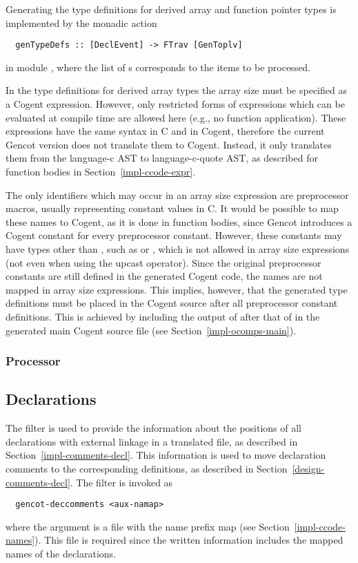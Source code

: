 Generating the type definitions for derived array and function pointer types is implemented by the monadic action
\begin{verbatim}
  genTypeDefs :: [DeclEvent] -> FTrav [GenToplv]
\end{verbatim}
in module , where the list of s corresponds to the items
to be processed.

In the type definitions for derived array types the array size must be specified as a Cogent expression. However, only
restricted forms of expressions which can be evaluated at compile time are allowed here (e.g., no function application).
These expressions have the same syntax in C and in Cogent, therefore the current Gencot version does not translate them 
to Cogent. Instead, it only translates them from the language-c AST to language-c-quote AST, as described for function 
bodies in Section~\ref{impl-ccode-expr}. 

The only identifiers which may occur in an array size expression are preprocessor macros, usually representing constant
values in C. It would be possible to map these names to Cogent, as it is done in function bodies, since Gencot introduces
a Cogent constant for every preprocessor constant. However, these constants may have types other than , such as 
 or , which is not allowed in array size expressions (not even when using the upcast operator). Since
the original preprocessor constants are still defined in the generated Cogent code, the names are not mapped in array 
size expressions. This implies, however, that the generated type definitions must be placed in the Cogent source
after all preprocessor constant definitions. This is achieved by including the output of  after
that of  in the generated main Cogent source file (see Section~\ref{impl-ocomps-main}).

\subsubsection{Processor }

\subsection{Declarations}
\label{impl-ccomps-decls}

The filter  is used to provide the information about the positions of all declarations with
external linkage in
a translated file, as described in Section~\ref{impl-comments-decl}. This information is used to move declaration
comments to the corresponding definitions, as described in Section~\ref{design-comments-decl}. The filter 
is invoked as
\begin{verbatim}
  gencot-deccomments <aux-namap>
\end{verbatim}
where the argument is a file  with the name prefix map (see Section~\ref{impl-ccode-names}).
This file is required since the written information includes the mapped names of the declarations.

